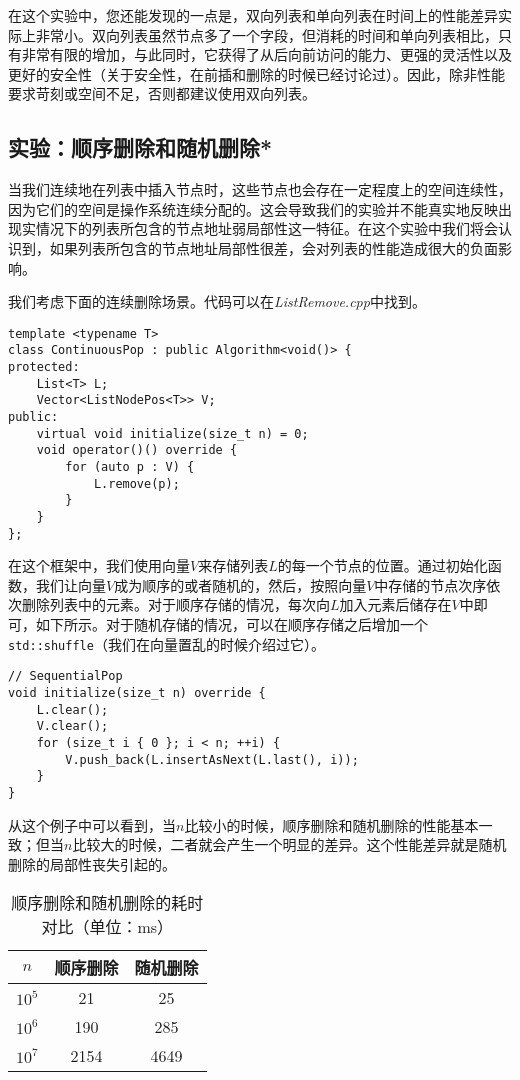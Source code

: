在这个实验中，您还能发现的一点是，双向列表和单向列表在时间上的性能差异实际上非常小。双向列表虽然节点多了一个字段，但消耗的时间和单向列表相比，只有非常有限的增加，与此同时，它获得了从后向前访问的能力、更强的灵活性以及更好的安全性（关于安全性，在前插和删除的时候已经讨论过）。因此，除非性能要求苛刻或空间不足，否则都建议使用双向列表。

\subsection{实验：顺序删除和随机删除*}
\label{list:顺序删除和随机删除}
当我们连续地在列表中插入节点时，这些节点也会存在一定程度上的空间连续性，因为它们的空间是操作系统连续分配的。这会导致我们的实验并不能真实地反映出现实情况下的列表所包含的节点地址弱局部性这一特征。在这个实验中我们将会认识到，如果列表所包含的节点地址局部性很差，会对列表的性能造成很大的负面影响。

我们考虑下面的连续删除场景。代码可以在\textit{ListRemove.cpp}中找到。

\begin{lstlisting}
template <typename T>
class ContinuousPop : public Algorithm<void()> {
protected:
    List<T> L;
    Vector<ListNodePos<T>> V;
public:
    virtual void initialize(size_t n) = 0;
    void operator()() override {
        for (auto p : V) {
            L.remove(p);
        }
    }
};
\end{lstlisting}

在这个框架中，我们使用向量$V$来存储列表$L$的每一个节点的位置。通过初始化函数，我们让向量$V$成为顺序的或者随机的，然后，按照向量$V$中存储的节点次序依次删除列表中的元素。对于顺序存储的情况，每次向$L$加入元素后储存在$V$中即可，如下所示。对于随机存储的情况，可以在顺序存储之后增加一个\lstinline{std::shuffle}（我们在向量置乱的时候介绍过它）。

\begin{lstlisting}
// SequentialPop
void initialize(size_t n) override {
    L.clear();
    V.clear();
    for (size_t i { 0 }; i < n; ++i) {
        V.push_back(L.insertAsNext(L.last(), i));
    }
}
\end{lstlisting}

从这个例子中可以看到，当$n$比较小的时候，顺序删除和随机删除的性能基本一致；但当$n$比较大的时候，二者就会产生一个明显的差异。这个性能差异就是随机删除的局部性丧失引起的。

\begin{table}
  \centering
  \caption{顺序删除和随机删除的耗时对比（单位：ms）}
  \begin{tabular}{c|cc}
    \toprule
    $n$ & 顺序删除 & 随机删除
      \\
    \midrule
    $10^5$ &  21 & 25 \\
    $10^6$ &  190 & 285 \\
    $10^7$ &  2154 & 4649 \\
    \bottomrule
  \end{tabular}
  \label{tab:lis3}
\end{table}

